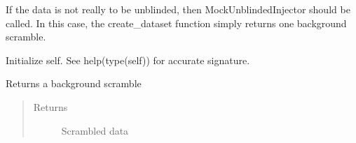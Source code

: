 \documentclass[letterpaper,10pt,english]{sphinxmanual}
\begin{document}
\begin{fulllineitems}
\label{\detokenize{index:flarestack.core.injector.MockUnblindedInjector}}
If the data is not really to be unblinded, then MockUnblindedInjector
should be called. In this case, the create\_dataset function simply returns
one background scramble.

\begin{fulllineitems}
\label{\detokenize{index:flarestack.core.injector.MockUnblindedInjector.__init__}}
Initialize self.  See help(type(self)) for accurate signature.

\end{fulllineitems}


\begin{fulllineitems}
\label{\detokenize{index:flarestack.core.injector.MockUnblindedInjector.create_dataset}}
Returns a background scramble
\begin{quote}\begin{description}
\item[{Returns}] \leavevmode
Scrambled data

\end{description}\end{quote}

\end{fulllineitems}


\end{fulllineitems}

\end{document}

